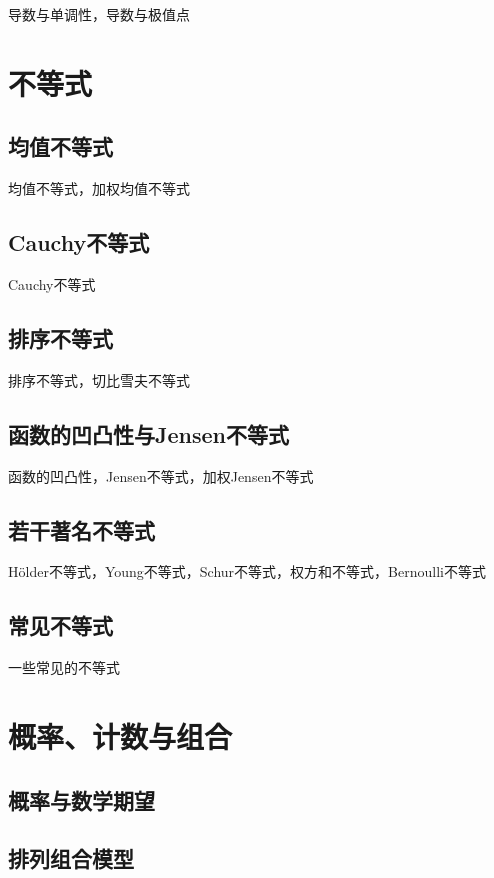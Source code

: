 \documentclass[lang=cn, zihao=4.5]{elegantbook}
\begin{document}
导数与单调性，导数与极值点

\chapter{不等式}

\section{均值不等式}

均值不等式，加权均值不等式

\section{Cauchy不等式}

Cauchy不等式

\section{排序不等式}

排序不等式，切比雪夫不等式

\section{函数的凹凸性与Jensen不等式}

函数的凹凸性，Jensen不等式，加权Jensen不等式

\section{若干著名不等式}

Hölder不等式，Young不等式，Schur不等式，权方和不等式，Bernoulli不等式

\section{常见不等式}

一些常见的不等式

\chapter{概率、计数与组合}

\section{概率与数学期望}

\section{排列组合模型}
\end{document}
